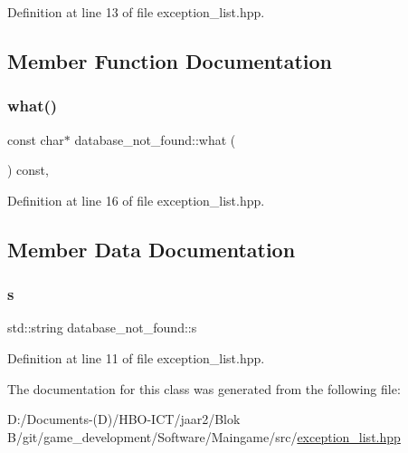 Definition at line 13 of file exception\+\_\+list.\+hpp.



\subsection{Member Function Documentation}
\mbox{\label{classdatabase__not__found_a820ce168a5d088576bcbc5ef6a26e4d1}} 
\subsubsection{\texorpdfstring{what()}{what()}}
{\footnotesize\ttfamily const char$\ast$ database\+\_\+not\+\_\+found\+::what (\begin{DoxyParamCaption}{ }\end{DoxyParamCaption}) const\hspace{0.3cm}{\ttfamily [inline]}, {\ttfamily [override]}}



Definition at line 16 of file exception\+\_\+list.\+hpp.



\subsection{Member Data Documentation}
\mbox{\label{classdatabase__not__found_a28b5ae319795530992f9d614ea1a2a5d}} 
\subsubsection{\texorpdfstring{s}{s}}
{\footnotesize\ttfamily std\+::string database\+\_\+not\+\_\+found\+::s\hspace{0.3cm}{\ttfamily [private]}}



Definition at line 11 of file exception\+\_\+list.\+hpp.



The documentation for this class was generated from the following file\+:\begin{DoxyCompactItemize}
\item 
D\+:/\+Documents-\/(\+D)/\+H\+B\+O-\/\+I\+C\+T/jaar2/\+Blok B/git/game\+\_\+development/\+Software/\+Maingame/src/\hyperlink{exception__list_8hpp}{exception\+\_\+list.\+hpp}\end{DoxyCompactItemize}
